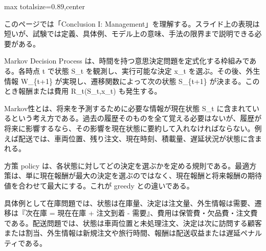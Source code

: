 \begin{minipage}[t]{0.58\textwidth}
\begin{adjustbox}{max totalsize={\textwidth}{0.89\textheight},center}
\begin{minipage}{\textwidth}\scriptsize
{}このページでは「Conclusion I: Management」を理解する。スライド上の表現は短いが、試験では定義、具体例、モデル上の意味、手法の限界まで説明できる必要がある。\par
Markov Decision Process は、時間を持つ意思決定問題を定式化する枠組みである。各時点 t で状態 S\_t を観測し、実行可能な決定 x\_t を選ぶ。その後、外生情報 W\_\{t+1\} が実現し、遷移関数によって次の状態 S\_\{t+1\} が決まる。このとき報酬または費用 R\_t(S\_t,x\_t) も発生する。\par
Markov性とは、将来を予測するために必要な情報が現在状態 S\_t に含まれているという考え方である。過去の履歴そのものを全て覚える必要はないが、履歴が将来に影響するなら、その影響を現在状態に要約して入れなければならない。例えば配送では、車両位置、残り注文、現在時刻、積載量、遅延状況が状態に含まれる。\par
方策 policy は、各状態に対してどの決定を選ぶかを定める規則である。最適方策は、単に現在報酬が最大の決定を選ぶのではなく、現在報酬と将来報酬の期待値を合わせて最大にする。これが greedy との違いである。\par
具体例として在庫問題では、状態は在庫量、決定は注文量、外生情報は需要、遷移は『次在庫 = 現在在庫 + 注文到着 - 需要』、費用は保管費・欠品費・注文費である。配送問題では、状態は車両位置と未処理注文、決定は次に訪問する顧客または割当、外生情報は新規注文や旅行時間、報酬は配送収益または遅延ペナルティである。\par

\end{minipage}
\end{adjustbox}
\end{minipage}
